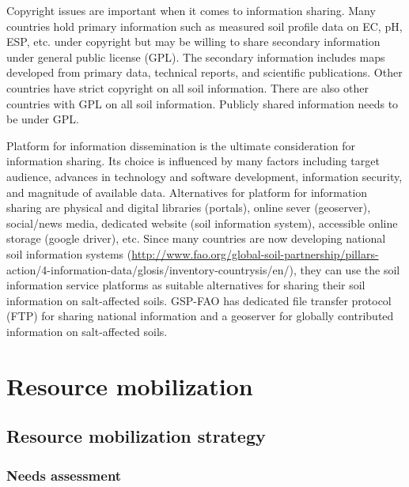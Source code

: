 \documentclass[
  10pt,
  b5paper,
]{book}
\begin{document}
Copyright issues are important when it comes to information sharing. Many countries hold primary information such as measured soil profile data on EC, pH, ESP, etc. under copyright but may be willing to share secondary information under general public license (GPL). The secondary information includes maps developed from primary data, technical reports, and scientific publications. Other countries have strict copyright on all soil information. There are also other countries with GPL on all soil information. Publicly shared information needs to be under GPL.

Platform for information dissemination is the ultimate consideration for information sharing. Its choice is influenced by many factors including target audience, advances in technology and software development, information security, and magnitude of available data. Alternatives for platform for information sharing are physical and digital libraries (portals), online sever (geoserver), social/news media, dedicated website (soil information system), accessible online storage (google driver), etc. Since many countries are now developing national soil information systems (\url{http://www.fao.org/global-soil-partnership/pillars-} action/4-information-data/glosis/inventory-countrysis/en/), they can use the soil information service platforms as suitable alternatives for sharing their soil information on salt-affected soils. GSP-FAO has dedicated file transfer protocol (FTP) for sharing national information and a geoserver for globally contributed information on salt-affected soils.

\hypertarget{resource-mobilization}{%
\section{Resource mobilization}\label{resource-mobilization}}

\hypertarget{resource-mobilization-strategy}{%
\subsection{Resource mobilization strategy}\label{resource-mobilization-strategy}}

\hypertarget{needs-assessment}{%
\subsubsection{Needs assessment}\label{needs-assessment}}
\end{document}
